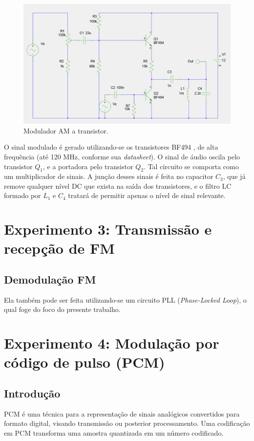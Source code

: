 \documentclass[]{report}
\begin{document}
\begin{figure}[H]
\begin{center}
\includegraphics[scale=0.25,clip]{./imagens/AM_Modulator_Transistor.png}
\end{center}
\caption{Modulador AM a transistor.}
\label{fig:modulador_AM_transistor}
\end{figure}


O sinal modulado é gerado utilizando-se os transistores BF494 \cite{BF494}, de alta frequência (até 120 MHz, conforme sua \textit{datasheet}). O sinal de áudio oscila pelo transistor $Q_1$, e a portadora pelo transistor $Q_2$. Tal circuito se comporta como um multiplicador de sinais. A junção desses sinais é feita no capacitor $C_3$, que já remove qualquer nível DC que exista na saída dos transistores, e o filtro LC formado por $L_1$ e $C_4$ tratará de permitir apenas o nível de sinal relevante.

\chapter{Experimento 3: Transmissão e recepção de FM}
\section{Demodulação FM}
Ela também pode ser feita utilizando-se um circuito PLL (\textit{Phase-Locked Loop}), o qual foge do foco do presente trabalho.
\chapter{Experimento 4: Modulação por código de pulso (PCM)}
\section{Introdução}
PCM é uma técnica para a representação de sinais analógicos convertidos para formato digital, visando transmissão ou posterior processamento. Uma codificação em PCM transforma uma amostra quantizada em um número codificado. \cite{renatodatacom}
\end{document}
